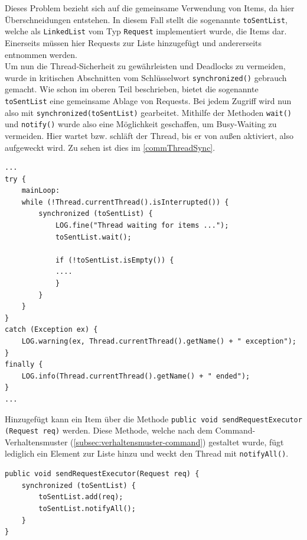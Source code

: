 \newpage
Dieses Problem bezieht sich auf die gemeinsame Verwendung von Items, da hier Überschneidungen entstehen.
In diesem Fall stellt die sogenannte \lstinline[style=java]{toSentList}, welche als \lstinline[style=java]{LinkedList} vom Typ \lstinline[style=java]{Request} implementiert wurde, die Items dar.
Einerseits müssen hier Requests zur Liste hinzugefügt und andererseits entnommen werden.\\
Um nun die Thread-Sicherheit zu gewährleisten und Deadlocks zu vermeiden, wurde in kritischen Abschnitten vom Schlüsselwort \lstinline[style=java]{synchronized()} gebrauch gemacht.
Wie schon im oberen Teil beschrieben, bietet die sogenannte \lstinline[style=java]{toSentList} eine gemeinsame Ablage von Requests.
Bei jedem Zugriff wird nun also mit \lstinline[style=java]{synchronized(toSentList)} gearbeitet.
Mithilfe der Methoden \lstinline[style=java]{wait()} und \lstinline[style=java]{notify()} wurde also eine Möglichkeit geschaffen, um Busy-Waiting zu vermeiden.
Hier wartet bzw. schläft der Thread, bis er von außen aktiviert, also aufgeweckt wird.
Zu sehen ist dies im \autoref{commThreadSync}.
\begin{lstlisting}[style=java,caption=Teilabschnitt CommunicationSendThread,label=commThreadSync]
...
try {
    mainLoop:
    while (!Thread.currentThread().isInterrupted()) {
        synchronized (toSentList) {
            LOG.fine("Thread waiting for items ...");
            toSentList.wait();

            if (!toSentList.isEmpty()) {
            ....
            }
        }
    }
}
catch (Exception ex) {
    LOG.warning(ex, Thread.currentThread().getName() + " exception");
}
finally {
    LOG.info(Thread.currentThread().getName() + " ended");
}
...
\end{lstlisting}
Hinzugefügt kann ein Item über die Methode \lstinline[style=java]{public void sendRequestExecutor (Request req)} werden.
Diese Methode, welche nach dem Command-Verhaltensmuster (\autoref{subsec:verhaltensmuster-command}) gestaltet wurde, fügt lediglich ein Element zur Liste hinzu und weckt den Thread mit \lstinline[style=java]{notifyAll()}.
%
\begin{lstlisting}[style=java,caption=Methode sendRequestExecutor(),label=sendRequestExecutor()]
public void sendRequestExecutor(Request req) {
    synchronized (toSentList) {
        toSentList.add(req);
        toSentList.notifyAll();
    }
}
\end{lstlisting}
